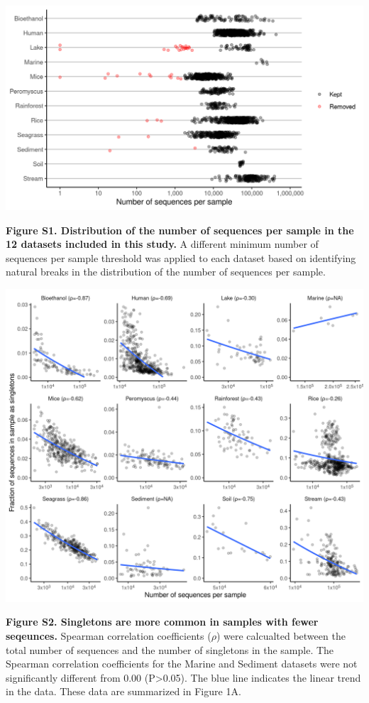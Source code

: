 \documentclass[
]{article}
\begin{document}
\newpage

\includegraphics{figure_s1.png}

\textbf{Figure S1. Distribution of the number of sequences per sample in
the 12 datasets included in this study.} A different minimum number of
sequences per sample threshold was applied to each dataset based on
identifying natural breaks in the distribution of the number of
sequences per sample.

\newpage

\includegraphics{figure_s2.png}

\textbf{Figure S2. Singletons are more common in samples with fewer
seqeunces.} Spearman correlation coefficients (\(\rho\)) were calcualted
between the total number of sequences and the number of singletons in
the sample. The Spearman correlation coefficients for the Marine and
Sediment datasets were not significantly different from 0.00
(P\textgreater0.05). The blue line indicates the linear trend in the
data. These data are summarized in Figure 1A.
\end{document}
